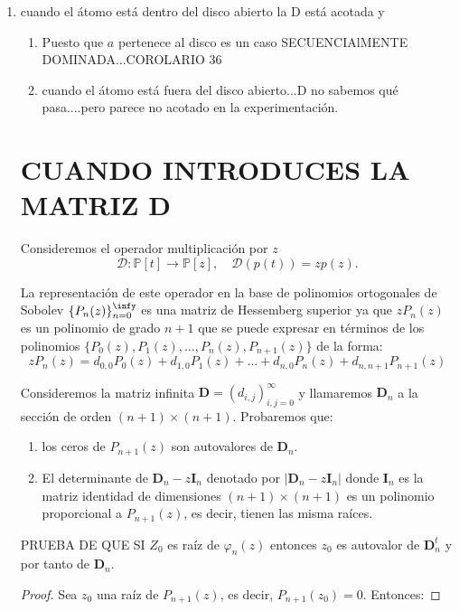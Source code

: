 \documentclass[11pt]{article}
\begin{document}
\begin{enumerate} 
\item cuando el átomo está dentro del disco abierto  la D está acotada y 
\begin{enumerate} 
\item Puesto que $a$ pertenece al disco es un caso SECUENCIAlMENTE DOMINADA...COROLARIO 36
\item cuando el átomo está fuera del disco abierto...D no sabemos qué pasa....pero parece no acotado en la experimentación. 
\end{enumerate} 






\section{CUANDO INTRODUCES LA MATRIZ D} 
\noindent Consideremos el operador multiplicaci\'{o}n por $z$ 
$$
\mathcal{D}: \mathbb{P}[t] \to \mathbb{P}[z], \quad \mathcal{D}(p(t))=zp(z).
$$

\noindent La representación de este operador en la base de polinomios ortogonales de Sobolev $\{P_n(z)\}_{n=0}^{\infy}$ es una matriz de Hessemberg superior ya que 
$zP_n(z)$ es un polinomio de grado $n+1$ que se puede expresar en términos de los polinomios $\{P_0(z),P_1(z), \dots,P_n(z),P_{n+1}(z)\}$ de la forma: 
$$
zP_n(z)= d_{0,0}P_0(z)+d_{1,0}P_1(z)+\dots+d_{n,0}P_n(z)+d_{n,n+1}P_{n+1}(z) 
$$

\noindent Consideremos la matriz infinita $\mathbf{D}=(d_{i,j})_{i,j=0}^{\infty}$ y llamaremos $\mathbf{D}_n$ a la sección de orden $(n+1)\times (n+1)$. 
\noindent Probaremos que: 
\begin{enumerate} 
\item los ceros de $P_{n+1}(z)$ son  autovalores de $\mathbf{D}_n$. 
\item El determinante de $\mathbf{D}_n -z \mathbf{I}_n$ denotado por $\vert \mathbf{D}_n -z \mathbf{I}_n\vert $ donde $\mathbf{I}_n$ es la matriz identidad de dimensiones $(n+1)\times (n+1)$ es un polinomio proporcional a $P_{n+1}(z)$, es decir, tienen las misma raíces.
\end{enumerate} 


\noindent PRUEBA DE QUE SI $Z_0$ es raíz de $\varphi_n(z)$ entonces $z_0$ es autovalor de $\mathbf{D}_n^{t}$ y por tanto de $\mathbf{D}_n$. 

\begin{proof} 
\noindent Sea $z_0$ una raíz de $P_{n+1}(z)$, es decir, $P_{n+1}(z_0)=0$. Entonces: 


\end{proof}
\end{enumerate}
\end{document}
